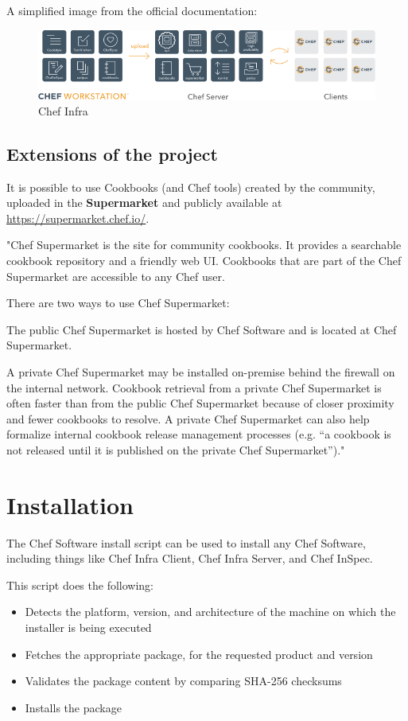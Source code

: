 \documentclass[12pt,a4paper,openright,twoside]{book}
\begin{document}
A simplified image from the official documentation:

\begin{figure}[H]
    \centering
    \includegraphics[width=.8\linewidth]{figures/chef_infra.png}
    \caption{Chef Infra}
    \label{fig:chef-infra-image}
\end{figure}

\subsection{Extensions of the project}
It is possible to use Cookbooks (and Chef tools) created by the community, uploaded in the \textbf{Supermarket} and publicly available at \url{https://supermarket.chef.io/}.


"Chef Supermarket is the site for community cookbooks. It provides a searchable cookbook repository and a friendly web UI. Cookbooks that are part of the Chef Supermarket are accessible to any Chef user.


There are two ways to use Chef Supermarket:


The public Chef Supermarket is hosted by Chef Software and is located at Chef Supermarket.


A private Chef Supermarket may be installed on-premise behind the firewall on the internal network. Cookbook retrieval from a private Chef Supermarket is often faster than from the public Chef Supermarket because of closer proximity and fewer cookbooks to resolve. A private Chef Supermarket can also help formalize internal cookbook release management processes (e.g. “a cookbook is not released until it is published on the private Chef Supermarket”)."\cite{chefSupermarket}

\section{Installation}
The Chef Software install script can be used to install any Chef Software, including things like Chef Infra Client, Chef Infra Server, and Chef InSpec.


This script does the following:
\begin{itemize}
    \item Detects the platform, version, and architecture of the machine on which the installer is being executed
    \item Fetches the appropriate package, for the requested product and version
    \item Validates the package content by comparing SHA-256 checksums
    \item Installs the package
\end{itemize}
\end{document}
